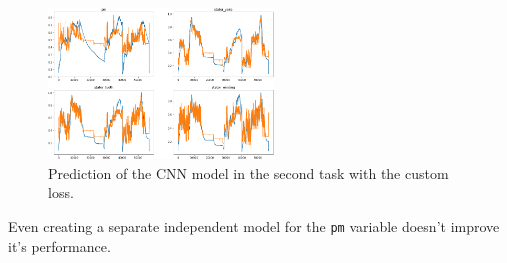 \begin{figure}[!h]
    \centering
    \includegraphics[width=\linewidth, height=4cm]{imgs/pred_second_custom_loss.png}
    \caption{Prediction of the CNN model in the second task with the custom loss.}
    \label{fig:cnn_second}
\end{figure}

Even creating a separate independent model for the \verb|pm| variable doesn't improve it's performance.


